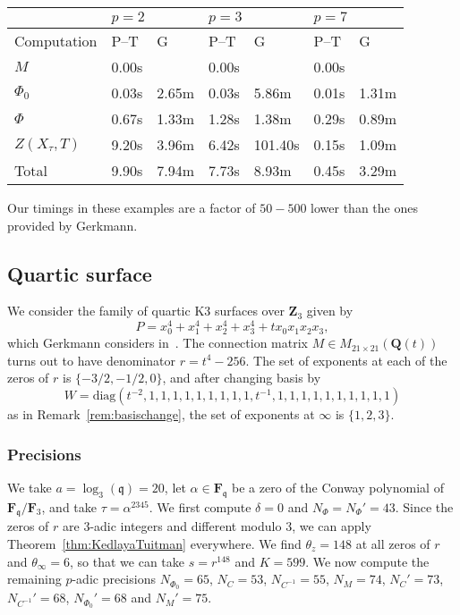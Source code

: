\documentclass[a4paper,11pt]{article}
\numberwithin{equation}{section}
\newcommand{\ZZ}{\mathbf{Z}} %
\newcommand{\QQ}{\mathbf{Q}} %
\newcommand{\FF}{\mathbf{F}} %
\theoremstyle{definition}
\begin{document}
\begin{center}
\begin{tabular}{l l l l l l l} \toprule
                & \multicolumn{2}{l}{$p = 2$} 
                & \multicolumn{2}{l}{$p = 3$} 
                & \multicolumn{2}{l}{$p = 7$} \\ \midrule
Computation     & P--T & G     & P--T  & G       & P--T & G     \\ \midrule
$M$             & 0.00s&       & 0.00s &         & 0.00s&       \\
$\Phi_0$        & 0.03s& 2.65m & 0.03s & 5.86m   & 0.01s& 1.31m \\
$\Phi$          & 0.67s& 1.33m & 1.28s & 1.38m   & 0.29s& 0.89m \\
$Z(X_{\tau},T)$ & 9.20s& 3.96m & 6.42s & 101.40s & 0.15s& 1.09m \\
Total           & 9.90s& 7.94m & 7.73s & 8.93m   & 0.45s& 3.29m \\ \bottomrule
\end{tabular} 
\end{center}

Our timings in these examples are a factor of $50-500$ lower than the ones 
provided by Gerkmann.

\subsection{Quartic surface}

We consider the family of quartic K3 surfaces over $\ZZ_3$ given by
\begin{equation*}
P=x_0^4 + x_1^4 + x_2^4 + x_3^4 + t x_0 x_1 x_2 x_3,
\end{equation*}
which Gerkmann considers in~\citep[\S 7.5]{Gerkmann2007}. The connection matrix 
$M \in M_{21 \times 21}(\QQ(t))$ turns out to have denominator 
$r=t^4-256$. The set of exponents at each of the zeros of $r$ is $\{-3/2,-1/2,0\}$, 
and after changing basis by
\[
W=\mbox{diag}(t^{-2},1,1,1,1,1,1,1,1,1,t^{-1},1,1,1,1,1,1,1,1,1,1)
\] 
as in Remark~\ref{rem:basischange}, the set of exponents  at $\infty$ is 
$\{1,2,3\}$. 

\subsubsection{Precisions}

We take $a=\log_3(\mathfrak{q})=20$, let $\alpha \in \FF_{\mathfrak{q}}$
be a zero of the Conway polynomial of $\FF_{\mathfrak{q}}/\FF_{3}$, and take
$\tau=\alpha^{2345}$.  We first compute $\delta=0$ and $N_{\Phi}=N_{\Phi}'=43$.  
Since the zeros of $r$ are $3$-adic integers and different modulo $3$, we can apply 
Theorem~\ref{thm:KedlayaTuitman} everywhere. We find $\theta_z=148$ at all zeros 
of $r$ and $\theta_{\infty}=6$, so that we can take $s=r^{148}$
and $K=599$. We now compute the remaining $p$-adic 
precisions $N_{\Phi_0}=65$, $N_C=53$, $N_{C^{-1}}=55$, $N_M=74$, 
$N_C'=73$, $N_{C^{-1}}'=68$, $N_{\Phi_0}'=68$ and $N_M'=75$.
\end{document}
